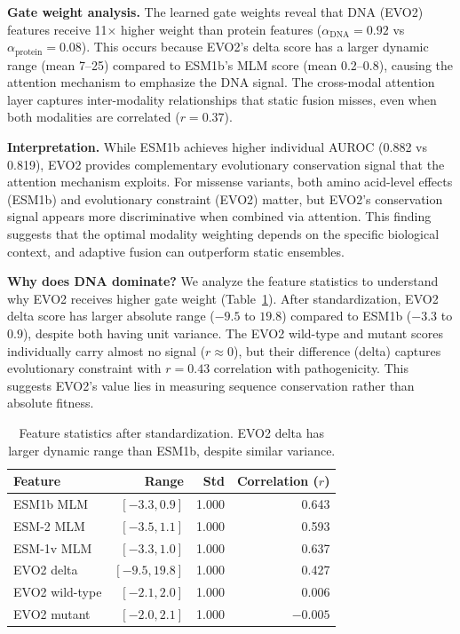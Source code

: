 \documentclass[9pt]{article}
\begin{document}
\textbf{Gate weight analysis.} The learned gate weights reveal that DNA (EVO2) features receive 11$\times$ higher weight than protein features ($\alpha_{\text{DNA}} = 0.92$ vs $\alpha_{\text{protein}} = 0.08$). This occurs because EVO2's delta score has a larger dynamic range (mean 7--25) compared to ESM1b's MLM score (mean 0.2--0.8), causing the attention mechanism to emphasize the DNA signal. The cross-modal attention layer captures inter-modality relationships that static fusion misses, even when both modalities are correlated ($r = 0.37$).

\textbf{Interpretation.} While ESM1b achieves higher individual AUROC (0.882 vs 0.819), EVO2 provides complementary evolutionary conservation signal that the attention mechanism exploits. For missense variants, both amino acid-level effects (ESM1b) and evolutionary constraint (EVO2) matter, but EVO2's conservation signal appears more discriminative when combined via attention. This finding suggests that the optimal modality weighting depends on the specific biological context, and adaptive fusion can outperform static ensembles.

\textbf{Why does DNA dominate?} We analyze the feature statistics to understand why EVO2 receives higher gate weight (Table~\ref{tab:feature_stats}). After standardization, EVO2 delta score has larger absolute range ($-9.5$ to $19.8$) compared to ESM1b ($-3.3$ to $0.9$), despite both having unit variance. The EVO2 wild-type and mutant scores individually carry almost no signal ($r \approx 0$), but their difference (delta) captures evolutionary constraint with $r = 0.43$ correlation with pathogenicity. This suggests EVO2's value lies in measuring sequence conservation rather than absolute fitness.

\begin{table}[h]
\centering
\caption{Feature statistics after standardization. EVO2 delta has larger dynamic range than ESM1b, despite similar variance.}
\label{tab:feature_stats}
\small
\begin{tabular}{lrrr}
\toprule
\textbf{Feature} & \textbf{Range} & \textbf{Std} & \textbf{Correlation ($r$)} \\
\midrule
ESM1b MLM & $[-3.3, 0.9]$ & 1.000 & 0.643 \\
ESM-2 MLM & $[-3.5, 1.1]$ & 1.000 & 0.593 \\
ESM-1v MLM & $[-3.3, 1.0]$ & 1.000 & 0.637 \\
\midrule
EVO2 delta & $[-9.5, 19.8]$ & 1.000 & 0.427 \\
EVO2 wild-type & $[-2.1, 2.0]$ & 1.000 & 0.006 \\
EVO2 mutant & $[-2.0, 2.1]$ & 1.000 & $-0.005$ \\
\bottomrule
\end{tabular}
\end{table}
\end{document}
